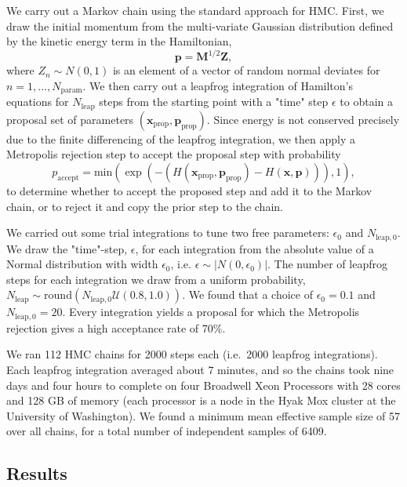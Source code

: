 \documentclass[fleqn,usenatbib]{mnras} %
\begin{document}
We carry out a Markov chain using the standard approach for HMC. First, we draw the initial momentum from the multi-variate Gaussian distribution defined by the kinetic energy term in the Hamiltonian,
\begin{equation}
    \mathbf{p} = \mathbf{M}^{1/2} \mathbf{Z},
\end{equation}
where $Z_n \sim N(0,1)$ is an element of a vector of random normal deviates for $n=1,...,N_\mathrm{param}$.
We then carry out a leapfrog integration of Hamilton's equations for $N_\mathrm{leap}$ steps from the starting point with a "time" step $\epsilon$ to obtain a proposal set of parameters $(\mathbf{x}_\mathrm{prop},\mathbf{p}_\mathrm{prop})$.  Since energy is not conserved precisely due to the finite differencing of the leapfrog integration, we then apply a Metropolis rejection step to accept the proposal step with probability
\begin{equation}
    p_\mathrm{accept} = \mathrm{min}(\exp(-(H(\mathbf{x}_\mathrm{prop},\mathbf{p}_\mathrm{prop}) - H(\mathbf{x},\mathbf{p}))),1),
\end{equation}
to determine whether to accept the proposed step and add it to the Markov chain, or to reject it and copy the prior step to the chain.

We carried out some trial integrations to tune two free parameters:  $\epsilon_0$ and $N_{\mathrm{leap},0}$.  We draw the "time"-step, $\epsilon$, for each integration from the absolute value of a Normal distribution with width $\epsilon_0$, i.e. $\epsilon \sim \vert N(0,\epsilon_0) \vert$.
The number of leapfrog steps for each integration we draw from a uniform probability,
$N_\mathrm{leap} \sim \mathrm{round}(N_{\mathrm{leap},0} \mathcal{U}(0.8,1.0))$.  We found that a choice of $\epsilon_0 = 0.1$
and $N_{\mathrm{leap},0} = 20$.  Every integration yields a proposal for which the Metropolis rejection gives a high acceptance rate of 70\%.  

We ran 112 HMC chains for 2000 steps each (i.e.\ 2000 leapfrog integrations).   Each leapfrog integration averaged about 7 minutes, and so the chains took nine
days and four hours to complete on four Broadwell Xeon Processors with 28 cores and  128 GB of memory (each processor is a node in the Hyak Mox cluster at the University of Washington).
We found a minimum mean effective sample size of 57 over all chains, for a 
total number of independent samples of 6409.

\subsection{Results}
\end{document}
